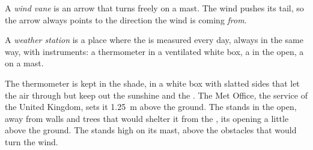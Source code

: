 \begin{definition}\label{def:g4:clouds-rain-snow:wind-vane}
A \emph{wind vane} is an arrow that turns freely on a
mast. The wind pushes its tail, so the arrow always points to the
direction the wind is coming \emph{from}.
\end{definition}

\begin{definition}\label{def:g4:clouds-rain-snow:weather-station}
A \emph{weather station} is a place where the 
is measured every day, always in the same way, with instruments: a
thermometer in a ventilated white box, a  in the open, a 
on a mast.
\end{definition}

The thermometer is kept in the shade, in a white box with slatted sides
that let the air through but keep out the sunshine and the . The Met
Office, the  service of the United Kingdom, sets it
\SI{1.25}{\metre} above the ground. The 
stands in the open, away from walls and trees that would shelter it from
the , its opening a little above the ground. The  stands high
on its mast, above the obstacles that would turn the wind.

